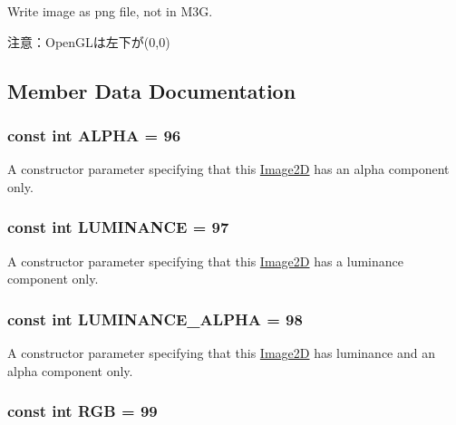 Write image as png file, not in M3G.

注意：OpenGLは左下が(0,0) 

\subsection{Member Data Documentation}
\hypertarget{classm3g_1_1Image2D_417581fcde4067111f47320edb2aa378}{
\subsubsection[{ALPHA}]{\setlength{\rightskip}{0pt plus 5cm}const int {\bf ALPHA} = 96}}
\label{classm3g_1_1Image2D_417581fcde4067111f47320edb2aa378}


A constructor parameter specifying that this \hyperlink{classm3g_1_1Image2D}{Image2D} has an alpha component only. \hypertarget{classm3g_1_1Image2D_3cf02f5117269e8ff112cbf5ecb790cd}{
\subsubsection[{LUMINANCE}]{\setlength{\rightskip}{0pt plus 5cm}const int {\bf LUMINANCE} = 97}}
\label{classm3g_1_1Image2D_3cf02f5117269e8ff112cbf5ecb790cd}


A constructor parameter specifying that this \hyperlink{classm3g_1_1Image2D}{Image2D} has a luminance component only. \hypertarget{classm3g_1_1Image2D_1a74b878039f244c27120cacb4eb6a3e}{
\subsubsection[{LUMINANCE\_\-ALPHA}]{\setlength{\rightskip}{0pt plus 5cm}const int {\bf LUMINANCE\_\-ALPHA} = 98}}
\label{classm3g_1_1Image2D_1a74b878039f244c27120cacb4eb6a3e}


A constructor parameter specifying that this \hyperlink{classm3g_1_1Image2D}{Image2D} has luminance and an alpha component only. \hypertarget{classm3g_1_1Image2D_5f237f1b0f2ce6351e9e4a494b8dc759}{
\subsubsection[{RGB}]{\setlength{\rightskip}{0pt plus 5cm}const int {\bf RGB} = 99}}
\label{classm3g_1_1Image2D_5f237f1b0f2ce6351e9e4a494b8dc759}


